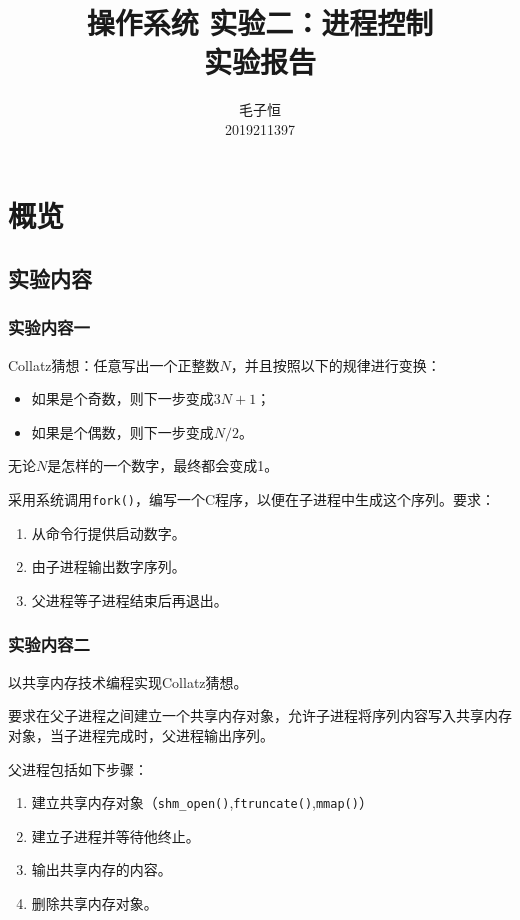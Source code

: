 \documentclass[lang=cn,11pt,a4paper,cite=authornum]{paper}
\title{操作系统 实验二：进程控制 \\ 实验报告}
\author{毛子恒 \\ 2019211397}
\institute{北京邮电大学\ 计算机学院}
\date{\zhtoday}
\begin{document}
\maketitle

\section{概览}

\subsection{实验内容}

\subsubsection{实验内容一}

Collatz猜想：任意写出一个正整数$N$，并且按照以下的规律进行变换：

\begin{itemize}
    \item 如果是个奇数，则下一步变成$3N+1$；
    \item 如果是个偶数，则下一步变成$N/2$。
\end{itemize}

无论$N$是怎样的一个数字，最终都会变成1。

采用系统调用\texttt{fork()}，编写一个C程序，以便在子进程中生成这个序列。要求：

\begin{enumerate}
    \item 从命令行提供启动数字。
    \item 由子进程输出数字序列。
    \item 父进程等子进程结束后再退出。
\end{enumerate}

\subsubsection{实验内容二}

以共享内存技术编程实现Collatz猜想。

要求在父子进程之间建立一个共享内存对象，允许子进程将序列内容写入共享内存对象，当子进程完成时，父进程输出序列。

父进程包括如下步骤：

\begin{enumerate}
    \item 建立共享内存对象（\texttt{shm_open()},\texttt{ftruncate()},\texttt{mmap()}）
    \item 建立子进程并等待他终止。
    \item 输出共享内存的内容。
    \item 删除共享内存对象。
\end{enumerate}
\end{document}
